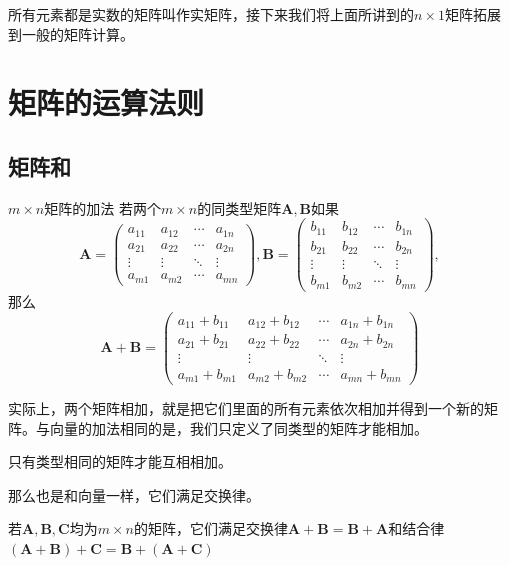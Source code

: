 所有元素都是实数的矩阵叫作实矩阵，接下来我们将上面所讲到的$n\times 1$矩阵拓展到一般的矩阵计算。

\section{矩阵的运算法则}

\subsection{矩阵和}

\begin{definition}{$m\times n$矩阵的加法}
	若两个$m\times n$的同类型矩阵$\mathbf{A},\mathbf{B}$如果
	$$
	\mathbf{A} = \begin{pmatrix}
		a_{11} & a_{12} & \cdots & a_{1n} \\
		a_{21} & a_{22} & \cdots & a_{2n} \\
		\vdots & \vdots & \ddots & \vdots \\
		a_{m1} & a_{m2} & \cdots & a_{mn}
		\end{pmatrix},
		\mathbf{B} = \begin{pmatrix}
			b_{11} & b_{12} & \cdots & b_{1n} \\
			b_{21} & b_{22} & \cdots & b_{2n} \\
			\vdots & \vdots & \ddots & \vdots \\
			b_{m1} & b_{m2} & \cdots & b_{mn}
			\end{pmatrix},
	$$
	那么$$
	\mathbf{A}+\mathbf{B}=\begin{pmatrix}
		a_{11}+b_{11} & a_{12}+b_{12} & \cdots & a_{1n}+b_{1n} \\
		a_{21}+b_{21} & a_{22}+b_{22} & \cdots & a_{2n}+b_{2n} \\
		\vdots & \vdots & \ddots & \vdots \\
		a_{m1}+b_{m1} & a_{m2}+b_{m2} & \cdots & a_{mn}+b_{mn}
		\end{pmatrix}
	$$
\end{definition}

实际上，两个矩阵相加，就是把它们里面的所有元素依次相加并得到一个新的矩阵。与向量的加法相同的是，我们只定义了同类型的矩阵才能相加。

\begin{postulate}
	\label{pos:addOfMatrix}
	只有类型相同的矩阵才能互相相加。
\end{postulate}

那么也是和向量一样，它们满足交换律。

\begin{corollary}
	若$\mathbf{A},\mathbf{B},\mathbf{C}$均为$m\times n$的矩阵，它们满足交换律$\mathbf{A}+\mathbf{B}=\mathbf{B}+\mathbf{A}$和结合律$(\mathbf{A}+\mathbf{B})+\mathbf{C}=\mathbf{B}+(\mathbf{A}+\mathbf{C})$
\end{corollary}

